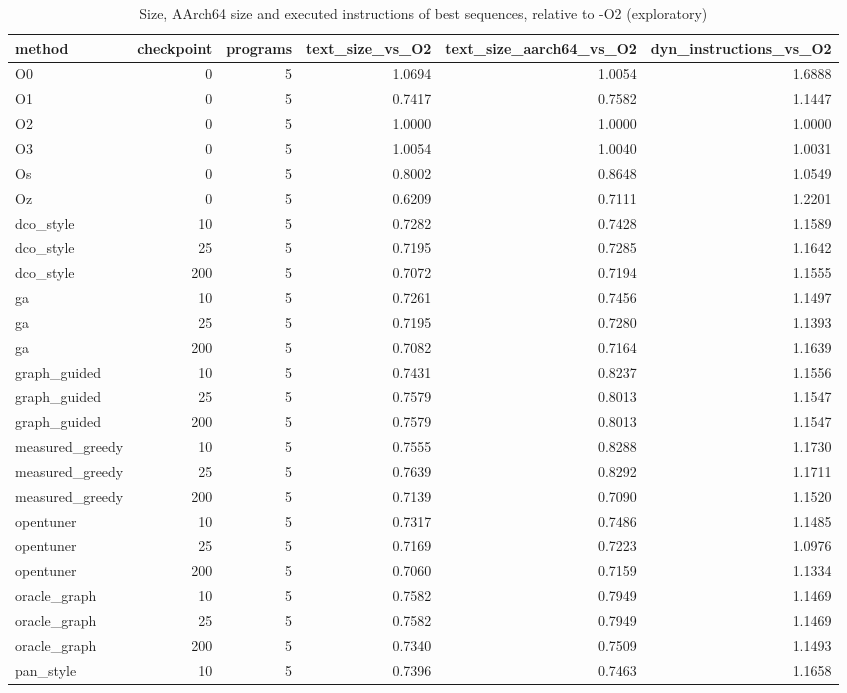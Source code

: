 \begin{table}[t]
\centering
\caption{Size, AArch64 size and executed instructions of best sequences, relative to -O2 (exploratory)}
\label{tab:v3-1-measured-vs-O2}
\begin{tabular}{lrrrrr}
\toprule
method & checkpoint & programs & text\_size\_vs\_O2 & text\_size\_aarch64\_vs\_O2 & dyn\_instructions\_vs\_O2 \\
\midrule
O0 & 0 & 5 & 1.0694 & 1.0054 & 1.6888 \\
O1 & 0 & 5 & 0.7417 & 0.7582 & 1.1447 \\
O2 & 0 & 5 & 1.0000 & 1.0000 & 1.0000 \\
O3 & 0 & 5 & 1.0054 & 1.0040 & 1.0031 \\
Os & 0 & 5 & 0.8002 & 0.8648 & 1.0549 \\
Oz & 0 & 5 & 0.6209 & 0.7111 & 1.2201 \\
dco\_style & 10 & 5 & 0.7282 & 0.7428 & 1.1589 \\
dco\_style & 25 & 5 & 0.7195 & 0.7285 & 1.1642 \\
dco\_style & 200 & 5 & 0.7072 & 0.7194 & 1.1555 \\
ga & 10 & 5 & 0.7261 & 0.7456 & 1.1497 \\
ga & 25 & 5 & 0.7195 & 0.7280 & 1.1393 \\
ga & 200 & 5 & 0.7082 & 0.7164 & 1.1639 \\
graph\_guided & 10 & 5 & 0.7431 & 0.8237 & 1.1556 \\
graph\_guided & 25 & 5 & 0.7579 & 0.8013 & 1.1547 \\
graph\_guided & 200 & 5 & 0.7579 & 0.8013 & 1.1547 \\
measured\_greedy & 10 & 5 & 0.7555 & 0.8288 & 1.1730 \\
measured\_greedy & 25 & 5 & 0.7639 & 0.8292 & 1.1711 \\
measured\_greedy & 200 & 5 & 0.7139 & 0.7090 & 1.1520 \\
opentuner & 10 & 5 & 0.7317 & 0.7486 & 1.1485 \\
opentuner & 25 & 5 & 0.7169 & 0.7223 & 1.0976 \\
opentuner & 200 & 5 & 0.7060 & 0.7159 & 1.1334 \\
oracle\_graph & 10 & 5 & 0.7582 & 0.7949 & 1.1469 \\
oracle\_graph & 25 & 5 & 0.7582 & 0.7949 & 1.1469 \\
oracle\_graph & 200 & 5 & 0.7340 & 0.7509 & 1.1493 \\
pan\_style & 10 & 5 & 0.7396 & 0.7463 & 1.1658 \\

\end{tabular}
\end{table}
